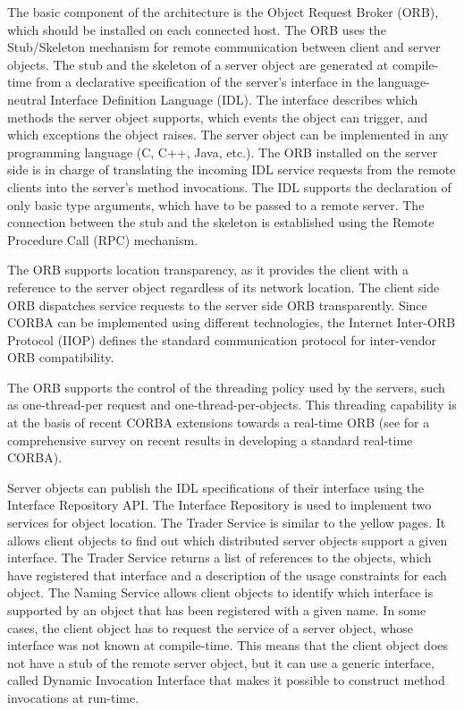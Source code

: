 The basic component of the architecture is the Object Request
Broker (ORB), which should be installed on each connected host.
The ORB uses the Stub/Skeleton mechanism for remote communication
between client and server objects. The stub and the skeleton of a
server object are generated at compile-time from a declarative
specification of the server's interface in the language-neutral
Interface Definition Language (IDL). The interface describes which
methods the server object supports, which events the object can
trigger, and which exceptions the object raises. The server object
can be implemented in any programming language (C, C++, Java,
etc.). The ORB installed on the server side is in charge of
translating the incoming IDL service requests from the remote
clients into the server's method invocations. The IDL supports the
declaration of only basic type arguments, which have to be passed
to a remote server. The connection between the stub and the
skeleton is established using the Remote Procedure Call (RPC)
mechanism.

The ORB supports location transparency, as it provides the client
with a reference to the server object regardless of its network
location. The client side ORB dispatches service requests to the
server side ORB transparently. Since CORBA can be implemented
using different technologies, the Internet Inter-ORB Protocol
(IIOP) defines the standard communication protocol for
inter-vendor ORB compatibility.

The ORB supports the control of the threading policy used by the
servers, such as one-thread-per request and
one-thread-per-objects. This threading capability is at the basis
of recent CORBA extensions towards a real-time ORB (see
\cite{CORBA-RT} for a comprehensive survey on recent results in
developing a standard real-time CORBA).

Server objects can publish the IDL specifications of their
interface using the Interface Repository API. The Interface
Repository is used to implement two services for object location.
The Trader Service is similar to the yellow pages. It allows
client objects to find out which distributed server objects
support a given interface. The Trader Service returns a list of
references to the objects, which have registered that interface
and a description of the usage constraints for each object. The
Naming Service allows client objects to identify which interface
is supported by an object that has been registered with a given
name. In some cases, the client object has to request the service
of a server object, whose interface was not known at compile-time.
This means that the client object does not have a stub of the
remote server object, but it can use a generic interface, called
Dynamic Invocation Interface that makes it possible to construct
method invocations at run-time.

